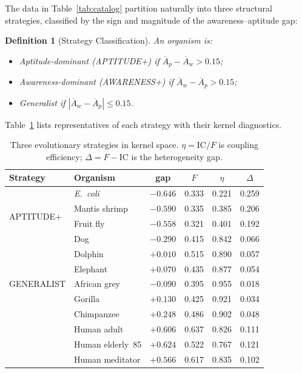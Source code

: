 \documentclass[
  aps,
  prd,
  twocolumn,
  superscriptaddress,
  nofootinbib,
  floatfix
]{revtex4-2}
\newtheorem{definition}[theorem]{Definition}
\newcommand{\IC}{\mathrm{IC}}
\newcommand{\Aw}{\overline{A}_{\!w}}
\newcommand{\Ap}{\overline{A}_{\!p}}
\begin{document}
The data in Table~\ref{tab:catalog} partition naturally into
three structural strategies, classified by the sign and
magnitude of the awareness--aptitude gap:

\begin{definition}[Strategy Classification]\label{def:strategy}
An organism is:
\begin{itemize}
\item \emph{Aptitude-dominant} (APTITUDE+) if
  $\Ap - \Aw > 0.15$;
\item \emph{Awareness-dominant} (AWARENESS+) if
  $\Aw - \Ap > 0.15$;
\item \emph{Generalist} if $|\Aw - \Ap| \leq 0.15$.
\end{itemize}
\end{definition}

Table~\ref{tab:strategies} lists representatives of each
strategy with their kernel diagnostics.

\begin{table}[h]
\caption{\label{tab:strategies}Three evolutionary strategies
in kernel space.  $\eta = \IC/F$ is coupling efficiency;
$\Delta = F - \IC$ is the heterogeneity gap.}
\begin{ruledtabular}
\begin{tabular}{llcccc}
Strategy & Organism & gap & $F$ & $\eta$ & $\Delta$ \\
\hline
\multirow{4}{*}{APTITUDE+}
  & \textit{E.~coli}    & $-0.646$ & 0.333 & 0.221 & 0.259 \\
  & Mantis shrimp       & $-0.590$ & 0.335 & 0.385 & 0.206 \\
  & Fruit fly            & $-0.558$ & 0.321 & 0.401 & 0.192 \\
  & Dog                  & $-0.290$ & 0.415 & 0.842 & 0.066 \\
\hline
\multirow{5}{*}{GENERALIST}
  & Dolphin     & $+0.010$ & 0.515 & 0.890 & 0.057 \\
  & Elephant    & $+0.070$ & 0.435 & 0.877 & 0.054 \\
  & African grey & $-0.090$ & 0.395 & 0.955 & 0.018 \\
  & Gorilla     & $+0.130$ & 0.425 & 0.921 & 0.034 \\
\hline
\multirow{4}{*}{AWARENESS+}
  & Chimpanzee  & $+0.248$ & 0.486 & 0.902 & 0.048 \\
  & Human adult & $+0.606$ & 0.637 & 0.826 & 0.111 \\
  & Human elderly~85 & $+0.624$ & 0.522 & 0.767 & 0.121 \\
  & Human meditator & $+0.566$ & 0.617 & 0.835 & 0.102 \\
\end{tabular}
\end{ruledtabular}
\end{table}
\end{document}
